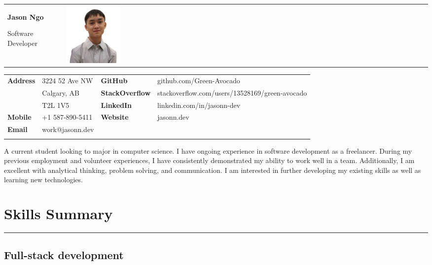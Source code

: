 \documentclass[letterpaper]{article}
\begin{document}
    \begin{tabular}{p{} >{\raggedleft\arraybackslash}m{}}
        {\Huge
        \textbf{Jason Ngo}}

        {\large
        Software Developer}
        &
        \includegraphics[width=0.15\textwidth]{../resources/pfp.png}
    \end{tabular}

    {\small%
        \renewcommand{\arraystretch}{1.5}
        \begin{tabular}{p{} p{} p{} p{}}
            \\
            \textbf{Address} & 3224 52 Ave NW & \textbf{GitHub} & github.com/Green-Avocado \\
            & Calgary, AB & \textbf{StackOverflow} & stackoverflow.com/users/13528169/green-avocado \\
            & T2L 1V5 & \textbf{LinkedIn} & linkedin.com/in/jasonn-dev \\
            \textbf{Mobile} & +1 587-890-5411 & \textbf{Website} & jasonn.dev \\
            \textbf{Email} & work@jasonn.dev \\
            \\
        \end{tabular}
    }

    A current student looking to major in computer science.
    I have ongoing experience in software development as a freelancer.
    During my previous employment and volunteer experiences, I have consistently demonstrated my ability to work well in a team.
    Additionally, I am excellent with analytical thinking, problem solving, and communication.
    I am interested in further developing my existing skills as well as learning new technologies.

    \section*{Skills Summary}

        \rule{\textwidth}{0.2pt}

        \subsection*{Full-stack development}
\end{document}
